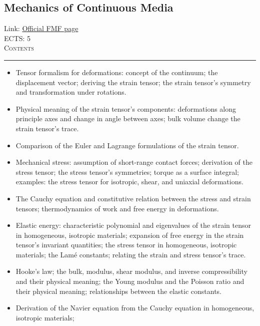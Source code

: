 \documentclass[11pt, a4paper]{article}
\newenvironment{course}[3]{
\subsection{#1}%
Link: \href{#2}{Official FMF page}\\%
ECTS: #3%
\vspace{1ex}
\\
{\large \textsc{Contents}}\\[-0.9ex]%
\rule{\textwidth}{0.5pt}
\vspace{-3ex}
}
{}
\newenvironment{chapter}[1]{
\begin{tcolorbox}[title=#1, breakable]
}
{\end{tcolorbox}}
\begin{document}
\begin{course}{Mechanics of Continuous Media}{https://www.fmf.uni-lj.si/en/study-physics/programmes/1fiz/2020/7000777/courses/1160/}{5}
    \label{mechanics-of-continuous-media}

    \begin{chapter}{Fundamentals of the theory of elasticity}
        \begin{itemize}
        
            \item Tensor formalism for deformations: concept of the continuum; the displacement vector; deriving the strain tensor; the strain tensor's symmetry and transformation under rotations.
            
            \item Physical meaning of the strain tensor's components: deformations along principle axes and change in angle between axes; bulk volume change the strain tensor's trace.
            
            \item Comparison of the Euler and Lagrange formulations of the strain tensor.

            \item Mechanical stress: assumption of short-range contact forces; derivation of the stress tensor; the stress tensor's symmetries; torque as a surface integral; examples: the stress tensor for isotropic, shear, and uniaxial deformations.
            
            \item The Cauchy equation and constitutive relation between the stress and strain tensors;
            thermodynamics of work and free energy in deformations.

            \item Elastic energy: characteristic polynomial and eigenvalues of the strain tensor in homogeneous, isotropic materials; expansion of free energy in the strain tensor's invariant quantities; the stress tensor in homogeneous, isotropic materials; the Lamé constants;
            relating the strain and stress tensor's trace.

            \item Hooke's law; the bulk, modulus, shear modulus, and inverse compressibility and their physical meaning;
            the Young modulus and the Poisson ratio and their physical meaning; relationships between the elastic constants.
            
            \item Derivation of the Navier equation from the Cauchy equation in homogeneous, isotropic materials;
            

\end{itemize}
\end{chapter}
\end{course}
\end{document}
